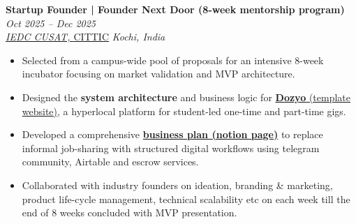 \documentclass[a4paper]{article}
\begin{document}
\textbf{Startup Founder | Founder Next Door (8-week mentorship program)} \hfill \textit{Oct 2025 -- Dec 2025} \\
\textit{\href{https://iedccusat.vercel.app/}{IEDC CUSAT, }}{\href{https://cittic.cusat.ac.in/}{CITTIC}} \hfill \textit{Kochi, India}
\begin{itemize}
    \item Selected from a campus-wide pool of proposals for an intensive 8-week incubator focusing on market validation and MVP architecture.
    \item Designed the \textbf{system architecture} and business logic for \href{https://dozyo.vercel.app/}{\textbf{Dozyo} (template website)}, a hyperlocal platform for student-led one-time and part-time gigs.
    \item Developed a comprehensive \textbf{\href{https://aaromalonline.notion.site/Dozyo-1d91d429a96d80f18f9afc22c54f1637}{business plan (notion page)}} to replace informal job-sharing with structured digital workflows using telegram community, Airtable and escrow services.
    \item Collaborated with industry founders on ideation, branding \& marketing, product life-cycle management, technical scalability etc on each week till the end of 8 weeks concluded with MVP presentation.
\end{itemize}
\vspace*{3mm}
\end{document}
